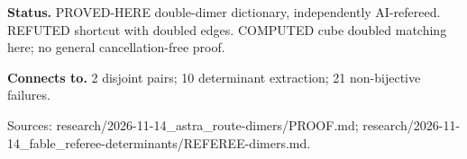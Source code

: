 \documentclass[10pt,a4paper]{amsart}
\begin{document}
\textbf{Status.} PROVED-HERE double-dimer dictionary, independently AI-refereed. REFUTED shortcut with doubled edges. COMPUTED cube doubled matching here; no general cancellation-free proof.

\textbf{Connects to.} 2 disjoint pairs; 10 determinant extraction; 21 non-bijective failures.

{\footnotesize\raggedright Sources: research/\allowbreak{}2026-11-14\_astra\_route-dimers/\allowbreak{}PROOF.md;\allowbreak{} research/\allowbreak{}2026-11-14\_fable\_referee-determinants/\allowbreak{}REFEREE-dimers.md.\par}
\end{document}
